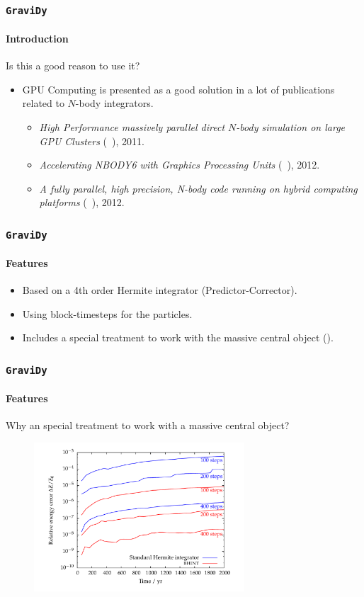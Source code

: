 \begin{frame}
    \frametitle{\texttt{GraviDy}}
    \framesubtitle{Introduction}

    Is this a good reason to use it?

    \begin{itemize}
        \item<1-> GPU Computing is presented as a good solution in a lot of publications
                 related to $N$-body integrators.
        \begin{itemize}
            \item<2-> \emph{High Performance massively parallel direct $N$-body simulation on
                      large GPU Clusters}
                      (~\cite{berczik2011high}), 2011.
            \item<3-> \emph{Accelerating NBODY6 with Graphics Processing Units}
                      (~\cite{2012MNRAS.424..545N}), 2012.
            \item<4-> \emph{A fully parallel, high precision, N-body code running on hybrid
                      computing platforms}
                      (~\cite{2012arXiv1207.2367C}), 2012.
        \end{itemize}
    \end{itemize}
\end{frame}

\begin{frame}
    \frametitle{\texttt{GraviDy}}
    \framesubtitle{Features}
    \begin{itemize}
        \item Based on a 4th order Hermite integrator (Predictor-Corrector).
        \item Using block-timesteps for the particles.
        \item Includes a special treatment to work with the massive central object ().
    \end{itemize}
\end{frame}

\begin{frame}
    \frametitle{\texttt{GraviDy}}
    \framesubtitle{Features}
    Why an special treatment to work with a massive central object?
    \begin{figure}
        \centering
        \label{fig:energy}
        \includegraphics[width=0.7\textwidth]{img/bhint_errors}
    \end{figure}
\end{frame}


